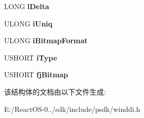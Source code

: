 \begin{DoxyCompactItemize}
L\+O\+NG {\bfseries l\+Delta}
\item 
\mbox{\label{struct___s_u_r_f_o_b_j_a0f045fd5f1abec47c25e9c10be23a8f9}} 
U\+L\+O\+NG {\bfseries i\+Uniq}
\item 
\mbox{\label{struct___s_u_r_f_o_b_j_a685e4555db8157ee86e98aa4295becb5}} 
U\+L\+O\+NG {\bfseries i\+Bitmap\+Format}
\item 
\mbox{\label{struct___s_u_r_f_o_b_j_a2173c1862c4a24760d329685978d7b57}} 
U\+S\+H\+O\+RT {\bfseries i\+Type}
\item 
\mbox{\label{struct___s_u_r_f_o_b_j_a22b631ed1047d4704a86ca123ed34436}} 
U\+S\+H\+O\+RT {\bfseries fj\+Bitmap}
\end{DoxyCompactItemize}


该结构体的文档由以下文件生成\+:\begin{DoxyCompactItemize}
\item 
E\+:/\+React\+O\+S-\/0../sdk/include/psdk/winddi.\+h\end{DoxyCompactItemize}
